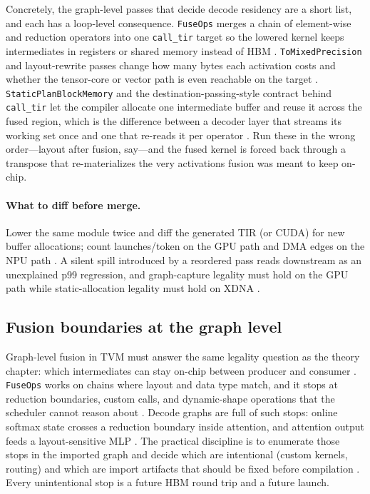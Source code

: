 Concretely, the graph-level passes that decide decode residency are a short list, and each has a loop-level consequence. \texttt{FuseOps} merges a chain of element-wise and reduction operators into one \texttt{call\_tir} target so the lowered kernel keeps intermediates in registers or shared memory instead of HBM \citep{chen2018tvm}. \texttt{ToMixedPrecision} and layout-rewrite passes change how many bytes each activation costs and whether the tensor-core or vector path is even reachable on the target \citep{lai2023relax}. \texttt{StaticPlanBlockMemory} and the destination-passing-style contract behind \texttt{call\_tir} let the compiler allocate one intermediate buffer and reuse it across the fused region, which is the difference between a decoder layer that streams its working set once and one that re-reads it per operator \citep{lai2023relax,memoryfloor2026}. Run these in the wrong order---layout after fusion, say---and the fused kernel is forced back through a transpose that re-materializes the very activations fusion was meant to keep on-chip.

\paragraph{What to diff before merge.} Lower the same module twice and diff the generated TIR (or CUDA) for new buffer allocations; count launches/token on the GPU path and DMA edges on the NPU path \citep{taxbreak2026,amd2024aie}. A silent spill introduced by a reordered pass reads downstream as an unexplained p99 regression, and graph-capture legality must hold on the GPU path while static-allocation legality must hold on XDNA \citep{nvidia2024cudagraphs,amd2024xdna}.

\subsection{Fusion boundaries at the graph level}

Graph-level fusion in TVM must answer the same legality question as the theory chapter: which intermediates can stay on-chip between producer and consumer \citep{chen2020compilerbasedhardw,memoryfloor2026}. \texttt{FuseOps} works on chains where layout and data type match, and it stops at reduction boundaries, custom calls, and dynamic-shape operations that the scheduler cannot reason about \citep{chen2018tvm,lai2023relax}. Decode graphs are full of such stops: online softmax state crosses a reduction boundary inside attention, and attention output feeds a layout-sensitive MLP \citep{dao2022flashattention,patel2025llminference}. The practical discipline is to enumerate those stops in the imported graph and decide which are intentional (custom kernels, routing) and which are import artifacts that should be fixed before compilation \citep{chen2018tvm,yirage2026}. Every unintentional stop is a future HBM round trip and a future launch.

